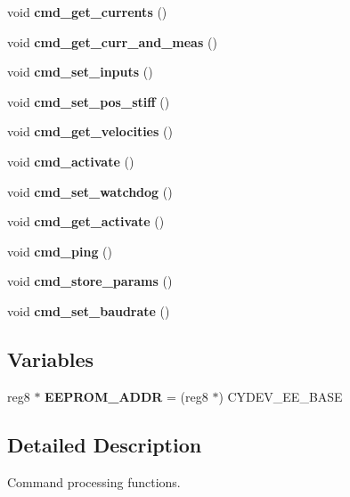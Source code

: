\begin{DoxyCompactItemize}
void {\bfseries cmd\+\_\+get\+\_\+currents} ()
\item 
\mbox{\label{command__processing_8c_a45a90a8455bfdb6a7f0e118da2c6f0a6}} 
void {\bfseries cmd\+\_\+get\+\_\+curr\+\_\+and\+\_\+meas} ()
\item 
\mbox{\label{command__processing_8c_a2d8a4542f55af960a27f875b00aad6a1}} 
void {\bfseries cmd\+\_\+set\+\_\+inputs} ()
\item 
\mbox{\label{command__processing_8c_a7897817859ac33d5a20b710af0f6a044}} 
void {\bfseries cmd\+\_\+set\+\_\+pos\+\_\+stiff} ()
\item 
\mbox{\label{command__processing_8c_a212883283bd7a8f32846615271cad8ce}} 
void {\bfseries cmd\+\_\+get\+\_\+velocities} ()
\item 
\mbox{\label{command__processing_8c_a107fc9f2982f9a953bdd82aa07279499}} 
void {\bfseries cmd\+\_\+activate} ()
\item 
\mbox{\label{command__processing_8c_aa94cd9c2e2fbfc5b98e84f67569cfe82}} 
void {\bfseries cmd\+\_\+set\+\_\+watchdog} ()
\item 
\mbox{\label{command__processing_8c_a554d563001517bfbc44400a1e999b393}} 
void {\bfseries cmd\+\_\+get\+\_\+activate} ()
\item 
\mbox{\label{command__processing_8c_a704f8c8cb0f4d75f243fc2b79bc34188}} 
void {\bfseries cmd\+\_\+ping} ()
\item 
\mbox{\label{command__processing_8c_a1a2493bfc2f30171d7e7a3bd5aebab14}} 
void {\bfseries cmd\+\_\+store\+\_\+params} ()
\item 
\mbox{\label{command__processing_8c_aa86bf1f2fa69ab5927f7e4e40eb40581}} 
void {\bfseries cmd\+\_\+set\+\_\+baudrate} ()
\end{DoxyCompactItemize}
\subsection*{Variables}
\begin{DoxyCompactItemize}
\item 
\mbox{\label{command__processing_8c_aba5b9353e6d38cc61eb2bd363df61248}} 
reg8 $\ast$ {\bfseries E\+E\+P\+R\+O\+M\+\_\+\+A\+D\+DR} = (reg8 $\ast$) C\+Y\+D\+E\+V\+\_\+\+E\+E\+\_\+\+B\+A\+SE
\end{DoxyCompactItemize}


\subsection{Detailed Description}
Command processing functions. 

